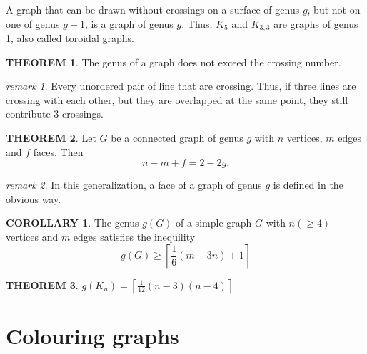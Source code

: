 \documentclass[a4paper,11pt]{article}%
\theoremstyle{remark}
\newtheorem*{remark}{remark}
\theoremstyle{definition}
\newtheorem{theorem}{THEOREM}[section]
\theoremstyle{definition}
\newtheorem{corollary}{COROLLARY}[section]
\theoremstyle{definition}
\theoremstyle{definition}
\theoremstyle{plain}
\theoremstyle{definition}
\begin{document}
A graph that can be drawn without crossings on a surface of genus $g$, but not on one of genus $g-1$, is a graph of genus $g$.
Thus, $K_5$ and $K_{3,3}$ are graphs of genus 1, also called toroidal graphs.
\begin{theorem}
    The genus of a graph does not exceed the crossing number.
\end{theorem}
\begin{remark}
    Every unordered pair of line that are crossing. Thus, if three lines are crossing with each other, but they are overlapped at the 
    same point, they still contribute 3 crossings.
\end{remark}
\begin{theorem}
    Let $G$ be a connected graph of genus $g$ with $n$ vertices, $m$ edges and $f$ faces. Then 
    \[n-m+f=2-2g.\]
\end{theorem}
\begin{remark}
    In this generalization, a face of a graph of genus $g$ is defined in the obvious way.
\end{remark}
\begin{corollary}
    The genus $g(G)$ of a simple graph $G$ with $n(\geq 4)$ vertices and $m$ edges satisfies the inequility
    \[g(G)\geq\left\lceil \frac{1}{6}(m-3n)+1\right\rceil \]
\end{corollary}
\begin{theorem}
    $g(K_n)=\left\lceil \frac{1}{12}(n-3)(n-4)\right\rceil  $
\end{theorem}
\section{Colouring graphs}
\end{document}

